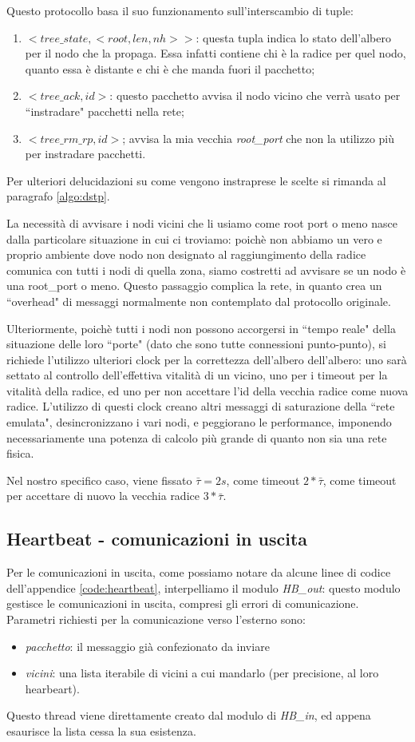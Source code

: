 \documentclass[italian]{memoir}
\begin{document}
Questo protocollo basa il suo funzionamento sull'interscambio di tuple:
\begin{enumerate}
\item $<tree\_state,<root,len,nh>>$: questa tupla indica lo stato dell'albero per il nodo che la propaga. Essa infatti contiene chi è la radice per quel nodo, quanto essa è distante e chi è che manda fuori il pacchetto;
\item $<tree\_ack, id>$: questo pacchetto avvisa il nodo vicino che verrà usato per ``instradare" pacchetti nella rete;
\item $<tree\_rm\_rp, id>$; avvisa la mia vecchia \textit{root\_port} che non la utilizzo più per instradare pacchetti.
\end{enumerate}
Per ulteriori delucidazioni su come vengono instraprese le scelte si rimanda al paragrafo \ref{algo:dstp}.

La necessità di avvisare i nodi vicini che li usiamo come root port o meno nasce dalla particolare situazione in cui ci troviamo: poichè non abbiamo un vero e proprio ambiente dove nodo non designato al raggiungimento della radice comunica con tutti i nodi di quella zona, siamo costretti ad avvisare se un nodo è una root\_port o meno. Questo passaggio complica la rete, in quanto crea un ``overhead" di messaggi normalmente non contemplato dal protocollo originale.

Ulteriormente, poichè tutti i nodi non possono accorgersi in ``tempo reale" della situazione delle loro ``porte" (dato che sono tutte connessioni punto-punto), si richiede l'utilizzo ulteriori clock per la correttezza dell'albero dell'albero: uno sarà settato al controllo dell'effettiva vitalità di un vicino, uno per i timeout per la vitalità della radice, ed uno per non accettare l'id della vecchia radice come nuova radice. L'utilizzo di questi clock creano altri messaggi di saturazione della ``rete emulata", desincronizzano i vari nodi, e peggiorano le performance, imponendo necessariamente una potenza di calcolo più grande di quanto non sia una rete fisica.

Nel nostro specifico caso, viene fissato $\bar{\tau} = 2 s$, come timeout  $2*\bar{\tau}$, come timeout per accettare di nuovo la vecchia radice $3*\bar{\tau}$.

\subsection{Heartbeat - comunicazioni in uscita}
Per le comunicazioni in uscita, come possiamo notare da alcune linee di codice dell'appendice \ref{code:heartbeat}, interpelliamo il modulo \textit{HB\_out}: questo modulo gestisce le comunicazioni in uscita, compresi gli errori di comunicazione. Parametri richiesti per la comunicazione verso l'esterno sono:
\begin{itemize}
\item \textit{pacchetto}: il messaggio già confezionato da inviare
\item \textit{vicini}: una lista iterabile di vicini a cui mandarlo (per precisione, al loro hearbeart).
\end{itemize}
Questo thread viene direttamente creato dal modulo di \textit{HB\_in}, ed appena esaurisce la lista cessa la sua esistenza.
\end{document}
